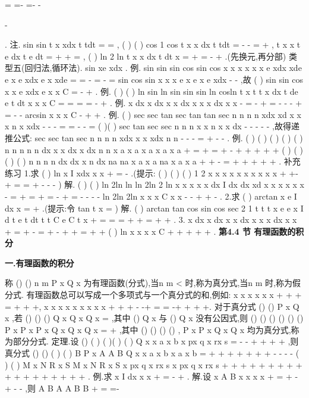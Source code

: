 =
=-
\cdots 
=-
-


-


\int 
\int 
\int 
\int 
. 
\textcolor{lyred}{注}. sin
sin
t
x
xdx
t
tdt
=
=
\int 
\int 
,
(
)
(
)
cos
1 cos
t
x
x
dx
t
tdt
=
-
-
=
+
\int 
\int 
, 
t
x
x
t
e
dx
t e dt
=
+
+
=
\int 
\int 
,
(
)
ln
2 ln
t
x
x dx
t
dt
x
=
+
=
-
+
\int 
\int 
.(先换元,再分部) 
\textcolor{lyred}{类型五(回归法},\textcolor{lyred}{循环法)}.
sin
xe
xdx
\int 
. 
\textcolor{lyred}{例}.
sin
sin
sin
cos
sin
cos
x
x
x
x
x
x
e
xdx
xde
e
x
e
xdx
e
x
xde
=
=
-
=
-
=
\int 
\int 
\int 
\int 
sin
cos
sin
x
x
x
e
x
e
x
e
xdx
-
-\int 
,故
(
)
sin
sin
cos
x
x
e
xdx
e
x
x
C
=
-
+
\int 
. 
\textcolor{lyred}{例}.
(
)
(
)
ln
sin ln
sin
sin
sin ln
cosln
t
x
t
t
x dx
t de
e
t dt
x
x
x
C
=
=
\cdots 
=
\cdots 
=
-
+
\int 
\int 
\int 
. 
\textcolor{lyred}{例}.
x
dx
x dx
x
x
dx
x
x
x dx
x
x
-
=
-
+
=
-
-
-
+
=
-
-
\int 
\int 
\int 
\int 
arcsin
x
x
x
C
-
+
+
. 
\textcolor{lyred}{例}.
(
)
sec
sec
tan
sec
tan
tan
sec
n
n
n
n
xdx
xd
x
x
x
n
x
xdx
-
-
-
=
=
-
-
=
\int 
\int 
\int 
(
)(
)
sec
tan
sec
sec
n
n
n
x
x
n
x
x dx
-
-
-
-
-
\int 
,故得递推公式: 
sec
sec
tan
sec
n
n
n
n
xdx
x
x
xdx
n
n
-
-
-
=
+
-
-
\int 
\int 
. 
\textcolor{lyred}{例}.
(
)
(
)
(
)
(
)
(
)
n
n
n
n
n
dx
x
x dx
x
dx
n
n
x
a
x
a
x
a
x
a
x
a
+
=
+
=
+
-
+
+
+
+
+
\int 
\int 
\int 
(
)
(
)
(
)
(
)
n
n
n
n
dx
dx
x
n
dx
na
na
x
a
x
a
na
x
a
x
a
+
+
-
\Rightarrow 
=
+
+
+
+
+
\int 
\int 
\int 
. 
\textcolor{lyred}{补充练习 }
1.求
(
)
ln
x
I
xdx
x x
+
=
-
\int 
.(提示:
(
)
(
)
(
)
1 2
x
x
x
x
x
x x
x x
x
+
+-
+
=
=
+
-
-
-
) 
解.
(
)
(
)
ln
2ln
ln
ln
2ln
2 ln
x
x
x
x
x
dx
I
dx
dx
xd
x
x
x
x x
x
-
=
+
=
+
=
-
+
=
-
-
-
-
\int 
\int 
\int 
\int 
ln
2ln
2ln
x
x
x
C
x
x
-
-
+
+
-
. 
2.求
(
)
arctan
x
e
I
dx
x
=
+
\int 
.(提示:令
tan
t
x
=
) 
解.
(
)
arctan
tan
cos
sin
cos
sec
2 1
t
t
t
x
e
e
x
I
d
t
e
t dt
t
t
C
e
C
t
x
+
=
=
\cdots 
=
+
+
=
+
+
\int 
\int 
. 
3.
x
dx
x dx
x
x
dx
x
x
x dx
x
x
+
=
+
-
=
+
-
+
+
=
+
+
\int 
\int 
\int 
\int 
(
)
ln
x
x
x
x
C
+
+
+
+
+
. 
\vspace{6pt}
{\large \bfseries \textcolor{lyred}{第4.4 节 有理函数的积分}}

\vspace{4pt}
{\bfseries \textcolor{lyred}{一.有理函数的积分}}

称
()
()
n
m
P x
Q
x 为\textcolor{lyred}{有理函数(分式)},当n
m
<
时,称为\textcolor{lyred}{真分式},当n
m
\ge 
时,称为\textcolor{lyred}{假分式}. 
有理函数总可以写成一个多项式与一个真分式的和,例如: 
x
x
x
x
x
x
+
+
+
=
+
+
+,
x
x
x
x
x
x
x
x
x
+
+
+
-
-+
=
=
-+
+
+
+. 
对于真分式
()
()
P x
Q x ,若
()
()
()
Q x
Q x Q
x
=
,其中
()
Q
x 与
()
Q
x 没有公因式,则 
()
()
()
()
()
()
P x
P x
P x
Q x
Q x
Q
x
=
+
,其中
()
()
()
()
,
P x
P x
Q
x
Q
x 均为真分式,称为\textcolor{lyred}{部分分式}. 
\textcolor{lyred}{定理}.设
()
(
)
(
)(
)
(
)
Q x
x
a
x
b
x
px
q
x
rx
s
\gamma 
\mu 
\alpha 
\beta 
=
-
-
+
+
+
+
\Lambda 
\Lambda 
,则真分式 
()
()
(
)
(
)
B
P x
A
A
B
Q x
x
a
x
b
x
a
x
b
\beta 
\alpha 
\alpha 
\beta 
=
+
+
+
+
+
+
+
-
-
-
-
\Lambda 
\Lambda 
\Lambda 
(
)
(
)
M x
N
R x
S
M x
N
R x
S
x
px
q
x
rx
s
x
px
q
x
rx
s
\gamma 
\gamma 
\mu 
\mu 
\gamma 
\mu 
+
+
+
+
+
+
+
+
+
+
+
+
+
+
+
+
+
+
\Lambda 
\Lambda 
\Lambda 
. 
\textcolor{lyred}{例}.求
x
I
dx
x
x
+
=
-
+
\int 
. 
解.设
x
A
B
x
x
x
x
+
=
+
-
+
-
-
,则
A
B
A
A
B
B
+
=
=-


